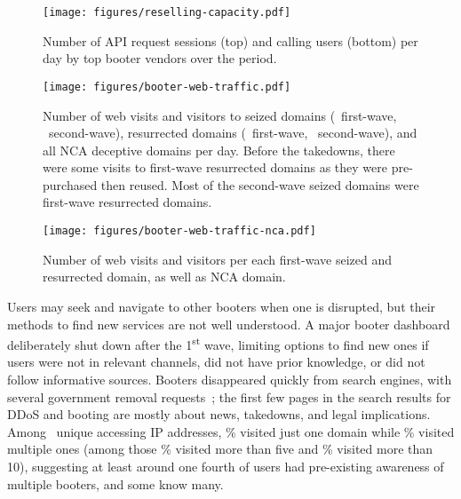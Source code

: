 \documentclass[letterpaper,twocolumn,10pt]{article}
\begin{document}
\begin{figure}[t]
    \centering
    \texttt{[image: figures/reselling-capacity.pdf]}\\
    \caption{Number of API request sessions (top) and calling users (bottom) per day by top booter vendors over the period.}
    \label{fig:reselling-capacity}
\end{figure}
\begin{figure*}[t]
    \centering
    \texttt{[image: figures/booter-web-traffic.pdf]}\\
    \caption{Number of web visits and visitors to seized domains (\BTnFirstWaveSeizedDomainsThatHasSimilarwebTraffic~first-wave, \BTnSecondWaveSeizedDomainsThatHasSimilarwebTraffic~second-wave), resurrected domains (\BTnFirstWaveResurrectedDomainsThatHasSimilarwebTraffic~first-wave, \BTnSecondWaveResurrectedDomainsThatHasSimilarwebTraffic~second-wave), and all NCA deceptive domains per day. Before the takedowns, there were some visits to first-wave resurrected domains as they were pre-purchased then reused. Most of the second-wave seized domains were first-wave resurrected domains.}
    \label{fig:booters-traffic}
\end{figure*}
\begin{figure}[t]
    \centering
    \texttt{[image: figures/booter-web-traffic-nca.pdf]}\\
    \caption{Number of web visits and visitors per each first-wave seized and resurrected domain, as well as NCA domain.}
    \label{fig:booter-traffic-nca}
\end{figure}
 Users may seek and navigate to other booters when one is disrupted, but their methods to find new services are not well understood. A major booter dashboard deliberately shut down after the 1\textsuperscript{st} wave, limiting options to find new ones if users were not in relevant channels, did not have prior knowledge, or did not follow informative sources. Booters disappeared quickly from search engines, with several government removal requests~\cite{ncalumendatabase}; the first few pages in the search results for DDoS and booting are mostly about news, takedowns, and legal implications. Among \BTNIPAccessingDomainsTotal~unique accessing IP addresses, \BTNIPAccessingOnlyOneDomainProps\% visited just one domain while \BTNIPAccessingMultipleDomainProps\% visited multiple ones (among those \BTNIPAccessingMoreThanFiveDomainProps\% visited more than five and \BTNIPAccessingMoreThanTenDomainProps\% visited more than 10), suggesting at least around one fourth of users had pre-existing awareness of multiple booters, and some know many. 
\end{document}
